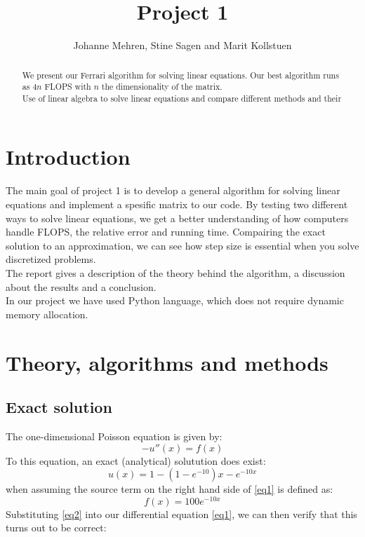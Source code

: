 \documentclass{article}
\title{Project 1}
\author{Johanne Mehren, Stine Sagen and Marit Kollstuen}
\begin{document}
\begin{abstract}
We present our Ferrari algorithm for solving linear equations. Our best algorithm runs as $4n$ FLOPS with $n$ the dimensionality of the matrix. \\
Use of linear algebra to solve linear equations and compare different methods and their 
\end{abstract}


\maketitle

\section{Introduction}
The main goal of project 1 is to develop a general algorithm for solving linear equations and implement a spesific matrix to our code. By testing two different ways to solve linear equations, we get a better understanding of how computers handle FLOPS, the relative error and running time. Compairing the exact solution to an approximation, we can see how step size is essential when you solve discretized problems. \\
The report gives a description of the theory behind the algorithm, a discussion about the results and a conclusion. \\ 
In our project we have used Python language, which does not require dynamic memory allocation. 


\section{Theory, algorithms and methods}
\subsection{Exact solution}
The one-dimensional Poisson equation is given by:
\begin{equation}\label{eq1} 
-u''(x) = f(x) 
\end{equation} 
To this equation, an exact (analytical) solutution does exist: 
\begin{equation}\label{eq2}
u(x) = 1 - (1-e^{-10})x - e^{-10x}
\end{equation}
when assuming the source term on the right hand side of \eqref{eq1} is defined as:
\begin{equation}\label{eq3}
f(x) = 100e^{-10x}
\end{equation} Substituting \eqref{eq2} into our differential equation \eqref{eq1}, we can then verify that this turns out to be correct:
\end{document}
